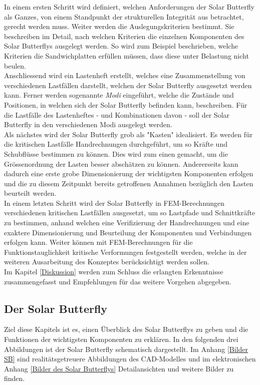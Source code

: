 In einem ersten Schritt wird definiert, welchen Anforderungen der Solar Butterfly als Ganzes, von einem Standpunkt der strukturellen Integrität aus betrachtet, gerecht werden muss. Weiter werden die Auslegungskriterien bestimmt. Sie beschreiben im Detail, nach welchen Kriterien die einzelnen Komponenten des Solar Butterflys ausgelegt werden. So wird zum Beispiel beschrieben, welche Kriterien die Sandwichplatten erfüllen müssen, dass diese unter Belastung nicht beulen.\\
Anschliessend wird ein Lastenheft erstellt, welches eine Zusammenstellung von verschiedenen Lastfällen darstellt, welchen der Solar Butterfly ausgesetzt werden kann. Ferner werden sogenannte \emph{Modi} eingeführt, welche die Zustände und Positionen, in welchen sich der Solar Butterfly befinden kann, beschreiben. Für die Lastfälle des Lastenheftes - und Kombinationen davon - soll der Solar Butterfly in den verschiedenen Modi ausgelegt werden.\\
Als nächstes wird der Solar Butterfly grob als "Kasten" idealisiert. Es werden für die kritischen Lastfälle Handrechnungen durchgeführt, um so Kräfte und Schubflüsse bestimmen zu können. Dies wird zum einen gemacht, um die Grössenordnung der Lasten besser abschätzen zu können. Andererseits kann dadurch eine erste grobe Dimensionierung der wichtigsten Komponenten erfolgen und die zu diesem Zeitpunkt bereits getroffenen Annahmen bezüglich den Lasten beurteilt werden.\\
In einem letzten Schritt wird der Solar Butterfly in FEM-Berechnungen verschiedenen kritischen Lastfällen ausgesetzt, um so Lastpfade und Schnittkräfte zu bestimmen, anhand welchen eine Verifizierung der Handrechnungen und eine exaktere Dimensionierung und Beurteilung der Komponenten und Verbindungen erfolgen kann. Weiter können mit FEM-Berechnungen für die Funktionstauglichkeit kritische Verformungen festgestellt werden, welche in der weiteren Ausarbeitung des Konzeptes berücksichtigt werden sollen.\\
Im Kapitel \ref{Diskussion} werden zum Schluss die erlangten Erkenntnisse zusammengefasst und Empfehlungen für das weitere Vorgehen abgegeben.

\subsection{Der Solar Butterfly}
Ziel diese Kapitels ist es, einen Überblick des Solar Butterflys zu geben und die Funktionen der wichtigsten Komponenten zu erklären.
In den folgenden drei Abbildungen ist der Solar Butterfly schematisch dargestellt. Im Anhang \ref{Bilder SB} sind realitätsgetreuere Abbildungen des CAD-Modelles und im elektronischen Anhang \ref{Bilder des Solar Butterflys} Detailansichten und weitere Bilder zu finden.


